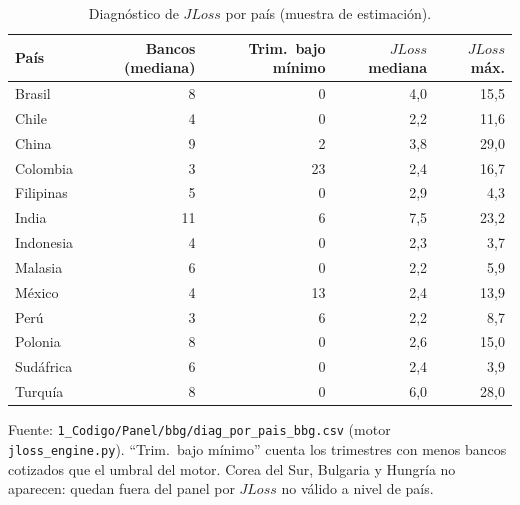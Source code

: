 \begin{table}[htbp]
\centering
\footnotesize
\caption{Diagnóstico de $JLoss$ por país (muestra de estimación).}
\label{tab:diagpais}
\begin{tabular}{lrrrr}
\toprule
País & Bancos (mediana) & Trim.\ bajo mínimo & $JLoss$ mediana & $JLoss$ máx. \\
\midrule
Brasil       & 8  & 0  & 4,0  & 15,5 \\
Chile        & 4  & 0  & 2,2  & 11,6 \\
China        & 9  & 2  & 3,8  & 29,0 \\
Colombia     & 3  & 23 & 2,4  & 16,7 \\
Filipinas    & 5  & 0  & 2,9  & 4,3  \\
India        & 11 & 6  & 7,5  & 23,2 \\
Indonesia    & 4  & 0  & 2,3  & 3,7  \\
Malasia      & 6  & 0  & 2,2  & 5,9  \\
México       & 4  & 13 & 2,4  & 13,9 \\
Perú         & 3  & 6  & 2,2  & 8,7  \\
Polonia      & 8  & 0  & 2,6  & 15,0 \\
Sudáfrica    & 6  & 0  & 2,4  & 3,9  \\
Turquía      & 8  & 0  & 6,0  & 28,0 \\
\bottomrule
\end{tabular}

\medskip
\footnotesize\raggedright Fuente: \texttt{1\_Codigo/Panel/bbg/diag\_por\_pais\_bbg.csv}
(motor \texttt{jloss\_engine.py}). ``Trim.\ bajo mínimo'' cuenta los trimestres con menos
bancos cotizados que el umbral del motor. Corea del Sur, Bulgaria y Hungría no aparecen:
quedan fuera del panel por $JLoss$ no válido a nivel de país.
\end{table}
